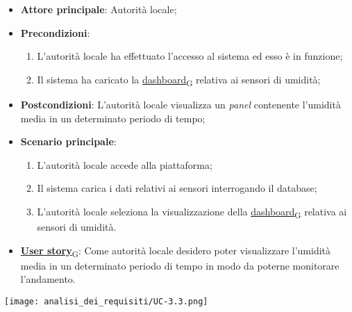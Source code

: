 \begin{itemize}
	\item \textbf{Attore principale}: Autorità locale;
	\item \textbf{Precondizioni}:
	      \begin{enumerate}
		      \item L'autorità locale ha effettuato l'accesso al sistema ed esso è in funzione;
		      \item Il sistema ha caricato la \href{https://7last.github.io/docs/rtb/documentazione-interna/glossario\#dashboard}{dashboard\textsubscript{G}} relativa ai sensori di umidità;
	      \end{enumerate}
	\item \textbf{Postcondizioni}: L'autorità locale visualizza un \textit{panel} contenente l'umidità media in un determinato periodo di tempo;
	\item \textbf{Scenario principale}:
	      \begin{enumerate}
		      \item L'autorità locale accede alla piattaforma;
		      \item Il sistema carica i dati relativi ai sensori interrogando il database;
		      \item L'autorità locale seleziona la visualizzazione della \href{https://7last.github.io/docs/rtb/documentazione-interna/glossario\#dashboard}{dashboard\textsubscript{G}} relativa ai sensori di umidità.
	      \end{enumerate}
	\item \href{https://7last.github.io/docs/rtb/documentazione-interna/glossario\#user-story}{\textbf{User story}\textsubscript{G}}: Come autorità locale desidero poter visualizzare l'umidità media in un determinato periodo di tempo
	      in modo da poterne monitorare l'andamento.
\end{itemize}
\begin{center}
	\texttt{[image: analisi\_dei\_requisiti/UC-3.3.png]}
\end{center}

